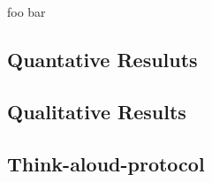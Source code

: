 foo bar

\subsection{\label{sec::QuantativeResults}Quantative Resuluts}

\subsection{\label{sec::QualitativeResults}Qualitative Results}

\subsection{\label{sec::ThinkAloudProtocol}Think-aloud-protocol}
